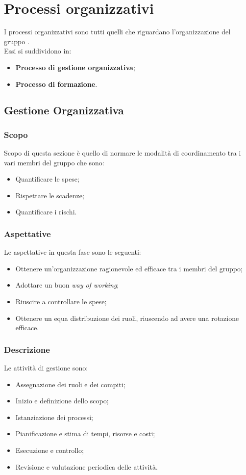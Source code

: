 \section{Processi organizzativi}\label{section:processi_organizzativi}
  I processi organizzativi sono tutti quelli che riguardano l'organizzazione del gruppo \groupName.\\ Essi si suddividono in:
  \begin{itemize}
    \item \textbf{Processo di gestione organizzativa};
    \item \textbf{Processo di formazione}.
  \end{itemize}

  \subsection{Gestione Organizzativa} \label{subsection:gestione_organizzativa}
  \subsubsection {Scopo}
  Scopo di questa sezione è quello di normare le modalità di coordinamento tra i vari membri del gruppo che sono:
  \begin {itemize}
      \item Quantificare le spese;
      \item Rispettare le scadenze;
      \item Quantificare i rischi.
  \end{itemize}
  \subsubsection{Aspettative}
  Le aspettative in questa fase sono le seguenti:
  \begin {itemize}
    \item Ottenere un'organizzazione ragionevole ed efficace tra i membri del gruppo;
    \item Adottare un buon \textit{way of working};
    \item Riuscire a controllare le spese;
    \item Ottenere un equa distribuzione dei ruoli, riuscendo ad avere una rotazione efficace.
  \end {itemize}
  \subsubsection{Descrizione}
  Le attività di gestione sono:
  \begin {itemize}
    \item Assegnazione dei ruoli e dei compiti;
    \item Inizio e definizione dello scopo;
    \item Istanziazione dei processi;
    \item Pianificazione e stima di tempi, risorse e costi; 
    \item Esecuzione e controllo;
    \item Revisione e valutazione periodica delle attività.
  \end {itemize}

